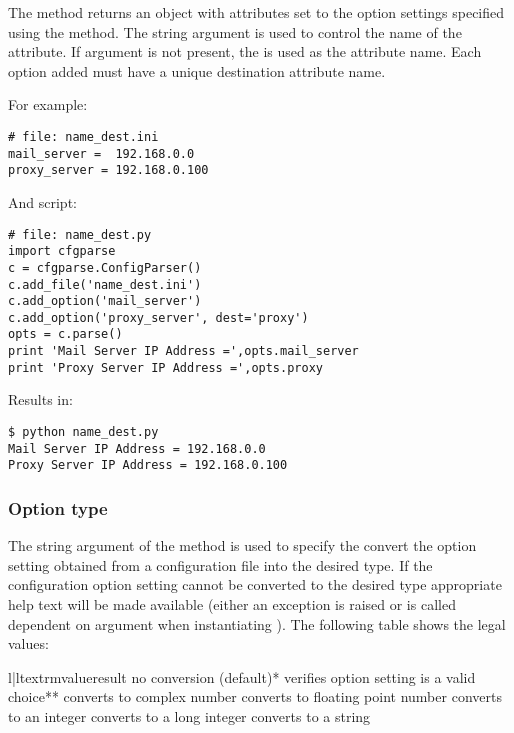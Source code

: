 \documentclass{howto}
\begin{document}
The  method returns an object with attributes set to the option
settings specified using the  method.  The  string
argument is used to control the name of the attribute.  If  argument
is not present, the  is used as the attribute name.  Each option
added must have a unique destination attribute name.

For example:

\begin{verbatim}
# file: name_dest.ini
mail_server =  192.168.0.0
proxy_server = 192.168.0.100
\end{verbatim}

And script:

\begin{verbatim}
# file: name_dest.py
import cfgparse
c = cfgparse.ConfigParser()
c.add_file('name_dest.ini')
c.add_option('mail_server')
c.add_option('proxy_server', dest='proxy')
opts = c.parse()
print 'Mail Server IP Address =',opts.mail_server
print 'Proxy Server IP Address =',opts.proxy
\end{verbatim}

Results in:

\begin{verbatim}
$ python name_dest.py
Mail Server IP Address = 192.168.0.0
Proxy Server IP Address = 192.168.0.100
\end{verbatim}
 
\subsubsection{Option type\label{cfgparse-option-type}}

The  string argument of the  method is used to specify
the convert the option setting obtained from a configuration file into the 
desired type.  If the configuration option setting cannot be converted to the
desired type appropriate help text will be made available (either an exception 
is raised or  is called dependent on  argument
when instantiating ).  The following table shows the legal values:

\begin{tableii}{l|l}{textrm}{value}{result}
      {no conversion (default)*}
  {verifies option setting is a valid choice**}
 {converts to complex number}
   {converts to floating point number}
     {converts to an integer}
    {converts to a long integer}
  {converts to a string}
\end{tableii}
\end{document}
